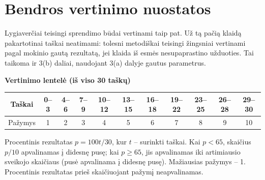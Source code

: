 \documentclass[12pt,a4paper]{exam}
\begin{document}
\section*{Bendros vertinimo nuostatos}
Lygiaverčiai teisingi sprendimo būdai vertinami taip pat. Už tą pačią klaidą pakartotinai taškai neatimami: tolesni metodiškai teisingi žingsniai vertinami pagal mokinio gautą rezultatą, jei klaida iš esmės nesupaprastino užduoties. Tai taikoma ir 3(b) daliai, naudojant 3(a) dalyje gautus parametrus.
\par\medskip
\begin{center}
\textbf{Vertinimo lentelė (iš viso 30 taškų)}\par\medskip
\setlength{\tabcolsep}{5pt}
\renewcommand{\arraystretch}{1.3}
\begin{tabular}{|c|*{10}{c|}}
\hline
Taškai & 0--3 & 4--6 & 7--9 & 10--12 & 13--15 & 16--18 & 19--22 & 23--25 & 26--28 & 29--30\\\hline
Pažymys & 1 & 2 & 3 & 4 & 5 & 6 & 7 & 8 & 9 & 10\\\hline
\end{tabular}
\end{center}
Procentinis rezultatas $p=100t/30$, kur $t$ -- surinkti taškai.
Kai $p<65$, skaičius $p/10$ apvalinamas į didesnę pusę;
kai $p\geq65$, jis apvalinamas iki artimiausio sveikojo skaičiaus
(pusė apvalinama į didesnę pusę). Mažiausias pažymys -- 1.
Procentinis rezultatas prieš skaičiuojant pažymį neapvalinamas.
\end{document}
